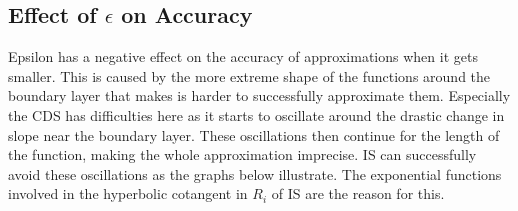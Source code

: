 \documentclass[../00_main.tex]{subfiles}
\begin{document}
\subsection{Effect of $\epsilon$ on Accuracy}

Epsilon has a negative effect on the accuracy of approximations when
it gets smaller. This is caused by the more extreme shape of the functions 
around the boundary layer that makes is harder to successfully approximate 
them. Especially the CDS has difficulties here as it starts to oscillate around 
the drastic change in slope near the boundary layer. These oscillations then 
continue for the length of the function, making the whole approximation 
imprecise. IS can successfully avoid these oscillations as the graphs below 
illustrate. The exponential functions involved in the hyperbolic cotangent in 
$R_i$ of IS are the reason for this.
\end{document}
